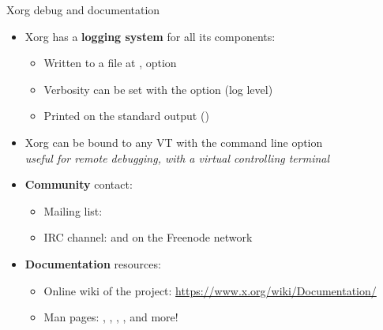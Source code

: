 \begin{frame}[fragile]{Xorg debug and documentation}
  \begin{itemize}
  \item Xorg has a \textbf{logging system} for all its components:
    \begin{itemize}
    \item Written to a file at ,  option
    \item Verbosity can be set with the  option (log level)
    \item Printed on the standard output ()
    \end{itemize}
  \item Xorg can be bound to any VT with the  command line option\\
    \textit{useful for remote debugging, with a virtual controlling terminal}
  \item \textbf{Community} contact:
    \begin{itemize}
    \item Mailing list: 
    \item IRC channel:  and  on the Freenode network
    \end{itemize}
  \item \textbf{Documentation} resources:
    \begin{itemize}
    \item Online wiki of the project: \url{https://www.x.org/wiki/Documentation/}
    \item Man pages: , , , ,  and more!
    \end{itemize}
  \end{itemize}
\end{frame}
